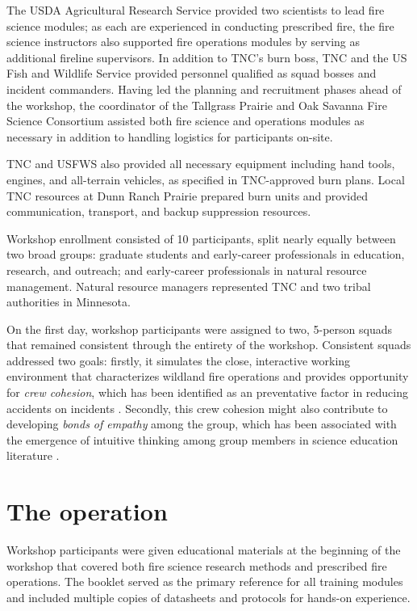 \documentclass[fire,article,submit,moreauthors,pdftex]{Definitions/mdpi}
\begin{document}
The USDA Agricultural Research Service provided two scientists to lead fire science modules; as each are experienced in conducting prescribed fire, the fire science instructors also supported fire operations modules by serving as additional fireline supervisors.
In addition to TNC's burn boss, TNC and the US Fish and Wildlife Service provided personnel qualified as squad bosses and incident commanders.
Having led the planning and recruitment phases ahead of the workshop, the coordinator of the Tallgrass Prairie and Oak Savanna Fire Science Consortium assisted both fire science and operations modules as necessary in addition to handling logistics for participants on-site.

TNC and USFWS also provided all necessary equipment including hand tools, engines, and all-terrain vehicles, as specified in TNC-approved burn plans.
Local TNC resources at Dunn Ranch Prairie prepared burn units and provided communication, transport, and backup suppression resources.

Workshop enrollment consisted of 10 participants, split nearly equally between two broad groups: graduate students and early-career professionals in education, research, and outreach; and early-career professionals in natural resource management.
Natural resource managers represented TNC and two tribal authorities in Minnesota.

On the first day, workshop participants were assigned to two, 5-person squads that remained consistent through the entirety of the workshop.
Consistent squads addressed two goals: firstly, it simulates the close, interactive working environment that characterizes wildland fire operations and provides opportunity for \emph{crew cohesion}, which has been identified as an preventative factor in reducing accidents on incidents \citep{mcdonald2003}.
Secondly, this crew cohesion might also contribute to developing \emph{bonds of empathy} among the group, which has been associated with the emergence of intuitive thinking among group members in science education literature \citep{park2020}.

\hypertarget{the-operation}{%
\section{The operation}\label{the-operation}}

Workshop participants were given educational materials at the beginning of the workshop that covered both fire science research methods and prescribed fire operations.
The booklet served as the primary reference for all training modules and included multiple copies of datasheets and protocols for hands-on experience.
\end{document}
